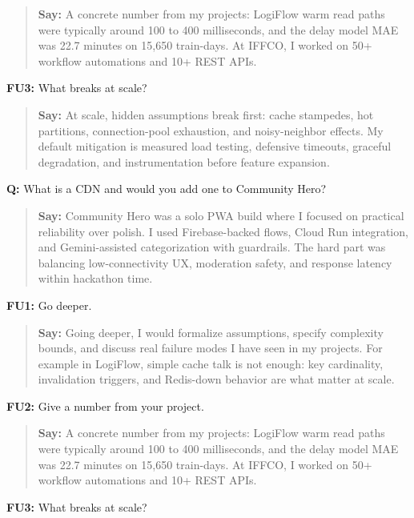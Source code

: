 \documentclass[9pt,a4paper]{article}
\begin{document}
\begin{quote}\small\textbf{Say:} A concrete number from my projects: LogiFlow warm read paths were typically around 100 to 400 milliseconds, and the delay model MAE was 22.7 minutes on 15,650 train-days. At IFFCO, I worked on 50+ workflow automations and 10+ REST APIs.\end{quote}
\vspace{2mm}
\textbf{FU3:} What breaks at scale?

\begin{quote}\small\textbf{Say:} At scale, hidden assumptions break first: cache stampedes, hot partitions, connection-pool exhaustion, and noisy-neighbor effects. My default mitigation is measured load testing, defensive timeouts, graceful degradation, and instrumentation before feature expansion.\end{quote}
\vspace{2mm}
\textbf{Q:} What is a CDN and would you add one to Community Hero?

\begin{quote}\small\textbf{Say:} Community Hero was a solo PWA build where I focused on practical reliability over polish. I used Firebase-backed flows, Cloud Run integration, and Gemini-assisted categorization with guardrails. The hard part was balancing low-connectivity UX, moderation safety, and response latency within hackathon time.\end{quote}
\vspace{2mm}
\textbf{FU1:} Go deeper.

\begin{quote}\small\textbf{Say:} Going deeper, I would formalize assumptions, specify complexity bounds, and discuss real failure modes I have seen in my projects. For example in LogiFlow, simple cache talk is not enough: key cardinality, invalidation triggers, and Redis-down behavior are what matter at scale.\end{quote}
\vspace{2mm}
\textbf{FU2:} Give a number from your project.

\begin{quote}\small\textbf{Say:} A concrete number from my projects: LogiFlow warm read paths were typically around 100 to 400 milliseconds, and the delay model MAE was 22.7 minutes on 15,650 train-days. At IFFCO, I worked on 50+ workflow automations and 10+ REST APIs.\end{quote}
\vspace{2mm}
\textbf{FU3:} What breaks at scale?
\end{document}
